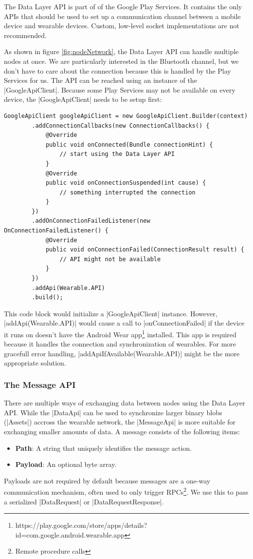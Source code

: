 The Data Layer API is part of of the Google Play Services.
It contains the only APIs that should be used to set up a communication channel between a mobile device and wearable devices. 
Custom, low-level socket implementations are not recommended.

As shown in figure \ref{fig:nodeNetwork}, the Data Layer API can handle multiple nodes at once.
We are particularly interested in the Bluetooth channel, but we don't have to care about the connection because this is handled by the Play Services for us.
The API can be reached using an instance of the |GoogleApiClient|\cite{androiddocs:googleapiclient}.
Because some Play Services may not be available on every device, the |GoogleApiClient| needs to be setup first:

\begin{lstlisting}[label=googleapiclient]
GoogleApiClient googleApiClient = new GoogleApiClient.Builder(context)
		.addConnectionCallbacks(new ConnectionCallbacks() {
			@Override
			public void onConnected(Bundle connectionHint) {
				// start using the Data Layer API
			}
			@Override
			public void onConnectionSuspended(int cause) {
				// something interrupted the connection
			}
		})
		.addOnConnectionFailedListener(new OnConnectionFailedListener() {
			@Override
			public void onConnectionFailed(ConnectionResult result) {
				// API might not be available
			}
		})
		.addApi(Wearable.API)
		.build();
\end{lstlisting}

This code block would initialize a |GoogleApiClient| instance.
However, |addApi(Wearable.API)| would cause a call to |onConnectionFailed| if the device it runs on doesn't have the Android Wear app\footnote{https://play.google.com/store/apps/details?id=com.google.android.wearable.app} installed.
This app is required because it handles the connection and synchronization of wearables.
For more gracefull error handling, |addApiIfAvailable(Wearable.API)| might be the more appropriate solution.

\subsubsection{The Message API}

There are multiple ways of exchanging data between nodes using the Data Layer API.
While the |DataApi|\cite{androiddocs:dataapi} can be used to synchronize larger binary blobs (|Assets|\cite{androiddocs:asset}) accross the wearable network, the |MessageApi|\cite{androiddocs:messageapi} is more suitable for exchanging smaller amounts of data.
A message consists of the following items:
\begin{itemize}[noitemsep]
	\item \textbf{Path}:
	A string that uniquely identifies the message action. 
	\item \textbf{Payload}:
	An optional byte array.
\end{itemize}
Payloads are not required by default because messages are a one-way communication mechanism, often used to only trigger RPCs\footnote{Remote procedure calls}. We use this to pass a serialized |DataRequest|\cite{sensordatalogger:datarequest} or |DataRequestResponse|\cite{sensordatalogger:datarequestresponse}.

